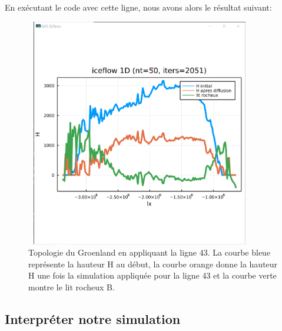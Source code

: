 \documentclass{article}
\begin{document}
En exécutant le code avec cette ligne, nous avons alors le résultat suivant: 
\begin{figure}[!htpb]
\centering
\includegraphics[width=10cm, keepaspectratio=true, height=10cm]{ligne43.png}
\caption{Topologie du Groenland en appliquant la ligne 43. La courbe bleue  représente la hauteur H au début, la courbe orange donne la hauteur H une fois la simulation appliquée pour la ligne 43 et la courbe verte montre le lit rocheux B. }
\end{figure}

\subsection{Interpréter notre simulation}
\end{document}
